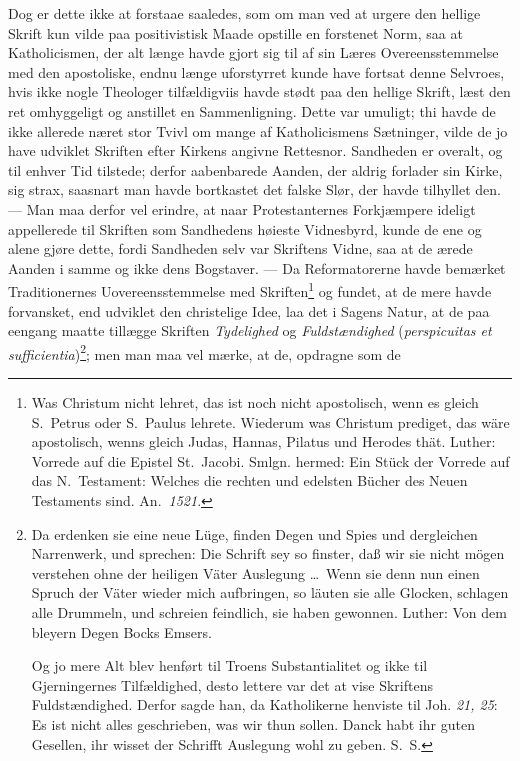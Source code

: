 \documentclass[12pt]{book}
\newcommand{\opage}[1]{\marginnote{\footnotesize\textit{[#1]}}}
\begin{document}
\opage{64} \setcounter{footnote}{0}%
Dog er dette ikke at forstaae saaledes, som om man ved at urgere den hellige
Skrift kun vilde paa positivistisk Maade opstille en forstenet Norm, saa at
Katholicismen, der alt længe havde gjort sig til af sin Læres
Overeensstemmelse med den apostoliske, endnu længe uforstyrret kunde have
fortsat denne Selvroes, hvis ikke nogle Theologer tilfældigviis havde stødt
paa den hellige Skrift, læst den ret omhyggeligt og anstillet en
Sammenligning. Dette var umuligt; thi havde de ikke allerede næret stor Tvivl
om mange af Katholicismens Sætninger, vilde de jo have udviklet Skriften
efter Kirkens angivne Rettesnor. Sandheden er overalt, og til enhver Tid
tilstede; derfor aabenbarede Aanden, der aldrig forlader sin Kirke, sig
strax, saasnart man havde bortkastet det falske Slør, der havde tilhyllet
den. --- Man maa derfor vel erindre, at naar Protestanternes Forkjæmpere
ideligt appellerede til Skriften som Sandhedens høieste Vidnesbyrd, kunde de
ene og alene gjøre dette, fordi Sandheden selv var Skriftens Vidne, saa at de
ærede Aanden i samme og ikke dens Bogstaver. --- Da Reformatorerne havde
bemærket Traditionernes Uovereensstemmelse med Skriften\footnote{Was Christum
nicht lehret, das ist noch nicht apostolisch, wenn es gleich S.~Petrus oder
S.~Paulus lehrete. Wiederum was Christum prediget, das wäre apostolisch, wenns
gleich Judas, Hannas, Pilatus und Herodes thät. Luther: Vorrede auf die
Epistel St.~Jacobi. Smlgn. hermed: Ein Stück der Vorrede auf das
N.~Testament: Welches die rechten und edelsten Bücher des Neuen Testaments
sind. An.~\textit{1521}.} og fundet, at de mere havde forvansket, end udviklet
den christelige Idee, laa det i Sagens Natur, at de paa eengang maatte
tillægge Skriften \emph{Tydelighed} og \emph{Fuldstændighed}
(\textit{perspicuitas et sufficientia})\footnote{Da erdenken sie eine neue
Lüge, finden Degen und Spies und dergleichen Narrenwerk, und sprechen: Die
Schrift sey so finster, daß wir sie nicht mögen verstehen ohne der heiligen
Väter Auslegung \ldots\ Wenn sie denn nun einen Spruch der Väter wieder mich
aufbringen, so läuten sie alle Glocken, schlagen alle Drummeln, und schreien
feindlich, sie haben gewonnen. Luther: Von dem bleyern Degen Bocks Emsers.

Og jo mere Alt blev henført til Troens Substantialitet og ikke til
Gjerningernes Tilfældighed, desto lettere var det at vise Skriftens
Fuldstændighed. Derfor sagde han, da Katholikerne henviste til Joh.
\textit{21, 25}: Es ist nicht alles geschrieben, was wir thun sollen. Danck
habt ihr guten Gesellen, ihr wisset der Schrifft Auslegung wohl zu geben.
S.~S.}; men man maa vel mærke, at de, opdragne som de
\end{document}
